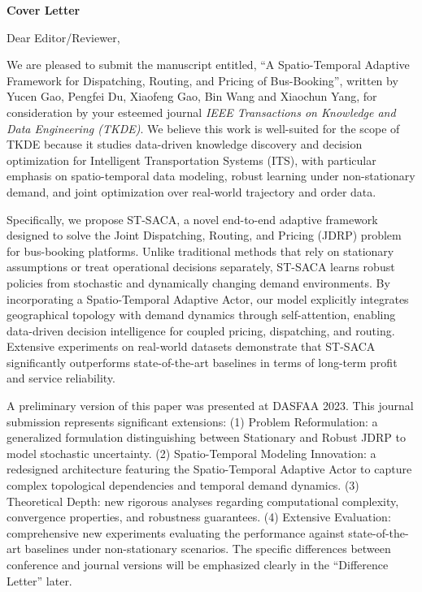 \documentclass[11pt, a4paper]{article}
\begin{document}
\centering
{\Large \textbf{Cover Letter}}

\raggedright


\noindent Dear Editor/Reviewer,  

We are pleased to submit the manuscript entitled, ``A Spatio-Temporal Adaptive Framework for Dispatching, Routing, and Pricing of Bus-Booking'', written by Yucen Gao, Pengfei Du, Xiaofeng Gao, Bin Wang and Xiaochun Yang, for consideration by your esteemed journal \emph{IEEE Transactions on Knowledge and Data Engineering (TKDE)}. We believe this work is well-suited for the scope of TKDE because it studies data-driven knowledge discovery and decision optimization for Intelligent Transportation Systems (ITS), with particular emphasis on spatio-temporal data modeling, robust learning under non-stationary demand, and joint optimization over real-world trajectory and order data.

Specifically, we propose ST-SACA, a novel end-to-end adaptive framework designed to solve the Joint Dispatching, Routing, and Pricing (JDRP) problem for bus-booking platforms. Unlike traditional methods that rely on stationary assumptions or treat operational decisions separately, ST-SACA learns robust policies from stochastic and dynamically changing demand environments. By incorporating a Spatio-Temporal Adaptive Actor, our model explicitly integrates geographical topology with demand dynamics through self-attention, enabling data-driven decision intelligence for coupled pricing, dispatching, and routing. Extensive experiments on real-world datasets demonstrate that ST-SACA significantly outperforms state-of-the-art baselines in terms of long-term profit and service reliability.

A preliminary version of this paper was presented at DASFAA 2023. This journal submission represents significant extensions: (1) Problem Reformulation: a generalized formulation distinguishing between Stationary and Robust JDRP to model stochastic uncertainty. (2) Spatio-Temporal Modeling Innovation: a redesigned architecture featuring the Spatio-Temporal Adaptive Actor to capture complex topological dependencies and temporal demand dynamics. (3) Theoretical Depth: new rigorous analyses regarding computational complexity, convergence properties, and robustness guarantees. (4) Extensive Evaluation: comprehensive new experiments evaluating the performance against state-of-the-art baselines under non-stationary scenarios. The specific differences between conference and journal versions will be emphasized clearly in the ``Difference Letter'' later.
\end{document}
